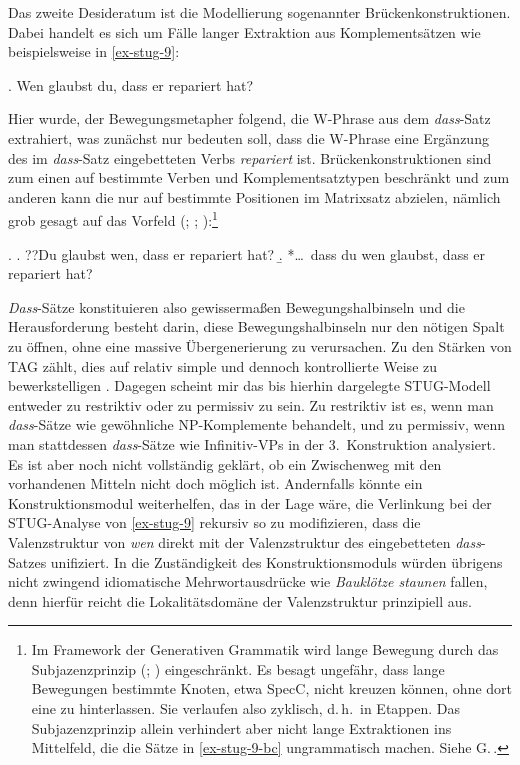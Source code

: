 Das zweite Desideratum ist die Modellierung sogenannter Brückenkonstruktionen. Dabei handelt es sich um  Fälle langer Extraktion aus Komplementsätzen wie beispielsweise in \ref{ex-stug-9}: 

\ex. \label{ex-stug-9} Wen glaubst du, dass er repariert hat?

Hier wurde, der Bewegungsmetapher folgend, die W-Phrase aus dem \textit{dass}-Satz extrahiert, was zunächst nur bedeuten soll, dass die W-Phrase eine Ergänzung des im \emph{dass}-Satz eingebetteten Verbs {\it repariert} ist. Brückenkonstruktionen sind zum einen auf bestimmte Verben und Komplementsatztypen beschränkt und zum anderen kann die  nur auf bestimmte Positionen im Matrixsatz abzielen, nämlich grob gesagt auf das Vorfeld (\citealt[Abschnitt~4.2.1.2]{Kvam:83}; \citealt{Luehr:88}; \citealt[Abschnitt~1.2]{Lutz:04}):\footnote{Im Framework der Generativen Grammatik wird lange Bewegung durch das Subjazenzprinzip (\citealt{Chomsky:73}; \citealt[Chapter~6]{Chomsky:86}) eingeschränkt. Es besagt ungefähr, dass lange Bewegungen bestimmte Knoten, etwa SpecC, nicht kreuzen können, ohne dort eine  zu hinterlassen. Sie verlaufen also zyklisch, d.\,h.\ in Etappen. Das Subjazenzprinzip allein verhindert aber nicht lange Extraktionen ins Mittelfeld, die die Sätze in \ref{ex-stug-9-bc} ungrammatisch machen. Siehe G.\,\cite{Mueller:Sternefeld:93}.}

\ex. \label{ex-stug-9-bc}
\a. ??Du glaubst wen, dass er repariert hat?\label{ex-stug-9-b} 
\b. *\ldots\ dass du wen glaubst, dass er repariert hat?\label{ex-stug-9-c} 

\textit{Dass}-Sätze konstituieren also gewissermaßen Bewegungshalbinseln und die Herausforderung besteht darin, diese Bewegungshalbinseln nur den nötigen Spalt zu öffnen, ohne eine massive Übergenerierung zu verursachen. Zu den Stärken von TAG zählt, dies auf relativ simple und dennoch kontrollierte Weise zu bewerkstelligen \citep{Kroch:89,Frank:06}. Dagegen scheint mir das bis hierhin dargelegte STUG-Modell entweder zu restriktiv oder zu permissiv zu sein. Zu restriktiv ist es, wenn man \textit{dass}-Sätze wie gewöhnliche NP-Komplemente behandelt, und zu permissiv, wenn man stattdessen \textit{dass}-Sätze wie Infinitiv-VPs in der 3.~Konstruktion analysiert. Es ist aber noch nicht vollständig geklärt, ob ein Zwischenweg mit den vorhandenen Mitteln nicht doch möglich ist. Andernfalls könnte ein Konstruktionsmodul weiterhelfen, das in der Lage wäre, die Verlinkung bei der STUG-Analyse von \ref{ex-stug-9} rekursiv so zu modifizieren, dass die Valenzstruktur von {\it wen} direkt mit der Valenzstruktur des eingebetteten \emph{dass}-Satzes unifiziert. In die Zuständigkeit des Konstruktionsmoduls würden übrigens nicht zwingend idiomatische Mehrwortausdrücke wie {\it Bauklötze staunen} fallen, denn hierfür reicht die Lokalitätsdomäne der Valenzstruktur prinzipiell aus.


